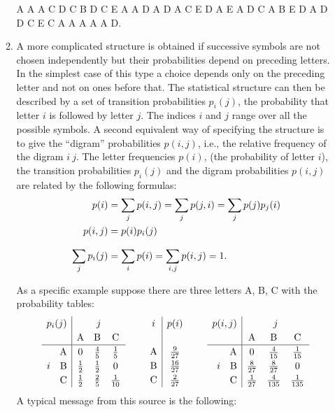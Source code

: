 \begin{enumerate}
\begin{enumerate}
A A A C D C B D C E A A D A D A C E D A\newline
E A D C A B E D A D D C E C A A A A A D.
\item
A more complicated structure is obtained if successive symbols are not
chosen independently but their probabilities depend on preceding letters.
In the simplest case of this type a choice depends only on the preceding
letter and not on ones before that.  The statistical structure can then be
described by a set of transition probabilities $p_i(j)$, the probability
that letter $i$ is followed by letter $j$.  The indices $i$ and $j$ range
over all the possible symbols.  A second equivalent way of specifying
the structure is to give the ``digram'' probabilities $p(i,j)$, i.e.,
the relative frequency of the digram $i ~j$.  The letter frequencies
$p(i)$, (the probability of letter $i$), the transition probabilities
$p_i(j)$ and the digram probabilities $p(i,j)$ are related by the
following formulas:
\begin{align*}
  p(i)&= \sum_j p(i,j) = \sum_j p(j,i) = \sum_j p(j) p_j (i) \\
p(i,j)&= p(i) p_i(j) \\
\sum_j^{\rule{0pt}{1ex}} p_i (j)&= \sum_i p(i) = \sum_{i,j} p(i,j) = 1.
\end{align*}

As a specific example suppose there are three letters A, B, C with the
probability tables:
$$
\renewcommand{\arraystretch}{1.2}
\begin{array}{r | c c c}
\multicolumn{1}{c}{p_i(j)} & \multicolumn{3}{|c}{j} \\
  & \text{A} & \text{B} & \text{C} \\ \hline
 \text{A} & 0 & \frac45 & \frac15 \\
i\quad\text{B} & \frac12 & \frac12 & 0 \\
\text{C} & \frac12 & \frac25 & \frac{1}{10}
\end{array}
\qquad
\begin{array}{c|c}
i & p(i) \\
\\
\text{A} & \frac{9}{27} \\
\text{B} & \frac{16}{27} \\
\text{C} & \frac{2}{27}
\end{array}
\qquad
\begin{array}{r | c c c}
\multicolumn{1}{c}{p(i,j)} & \multicolumn{3}{|c}{j} \\
  & \text{A} & \text{B} & \text{C} \\ \hline
\text{A} & 0 & \frac{4}{15} & \frac{1}{15} \\
i\quad\text{B} & \frac{8}{27} & \frac{8}{27} & 0 \\
\text{C} & \frac{1}{27} & \frac{4}{135} & \frac{1}{135}
\end{array}
$$
A typical message from this source is the following:


\end{enumerate}
\end{enumerate}
